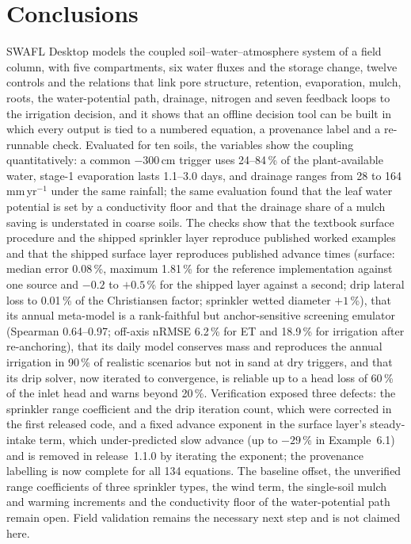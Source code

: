 \section{Conclusions}
SWAFL Desktop models the coupled soil--water--atmosphere system of a field column, with five compartments, six water fluxes and the storage change, twelve controls and the relations that link pore structure, retention, evaporation, mulch, roots, the water-potential path, drainage, nitrogen and seven feedback loops to the irrigation decision, and it shows that an offline decision tool can be built in which every output is tied to a numbered equation, a provenance label and a re-runnable check. Evaluated for ten soils, the variables show the coupling quantitatively: a common $-300$\,cm trigger uses 24--84\,\% of the plant-available water, stage-1 evaporation lasts 1.1--3.0 days, and drainage ranges from 28 to 164\,mm\,yr$^{-1}$ under the same rainfall; the same evaluation found that the leaf water potential is set by a conductivity floor and that the drainage share of a mulch saving is understated in coarse soils. The checks show that the textbook surface procedure and the shipped sprinkler layer reproduce published worked examples and that the shipped surface layer reproduces published advance times (surface: median error 0.08\,\%, maximum 1.81\,\% for the reference implementation against one source and $-0.2$ to $+0.5$\,\% for the shipped layer against a second; drip lateral loss to 0.01\,\% of the Christiansen factor; sprinkler wetted diameter $+1$\,\%), that its annual meta-model is a rank-faithful but anchor-sensitive screening emulator (Spearman 0.64--0.97; off-axis nRMSE 6.2\,\% for ET and 18.9\,\% for irrigation after re-anchoring), that its daily model conserves mass and reproduces the annual irrigation in 90\,\% of realistic scenarios but not in sand at dry triggers, and that its drip solver, now iterated to convergence, is reliable up to a head loss of 60\,\% of the inlet head and warns beyond 20\,\%. Verification exposed three defects: the sprinkler range coefficient and the drip iteration count, which were corrected in the first released code, and a fixed advance exponent in the surface layer's steady-intake term, which under-predicted slow advance (up to $-29$\,\% in Example~6.1) and is removed in release~1.1.0 by iterating the exponent; the provenance labelling is now complete for all 134 equations. The baseline offset, the unverified range coefficients of three sprinkler types, the wind term, the single-soil mulch and warming increments and the conductivity floor of the water-potential path remain open. Field validation remains the necessary next step and is not claimed here.

